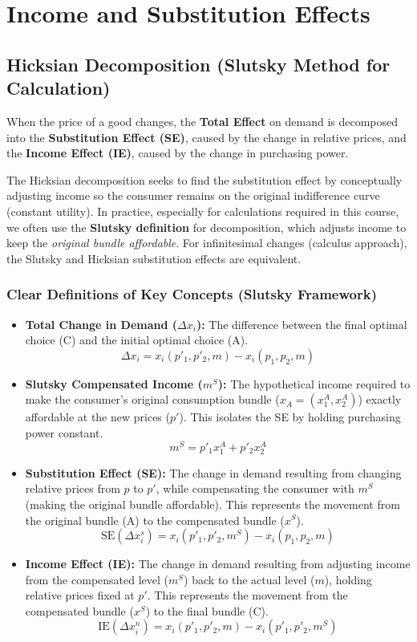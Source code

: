 \documentclass{article}
\begin{document}
\hrulefill

\section*{Income and Substitution Effects}
\subsection*{Hicksian Decomposition (Slutsky Method for Calculation)}

When the price of a good changes, the \textbf{Total Effect} on demand is decomposed into the \textbf{Substitution Effect (SE)}, caused by the change in relative prices, and the \textbf{Income Effect (IE)}, caused by the change in purchasing power.

The Hicksian decomposition seeks to find the substitution effect by conceptually adjusting income so the consumer remains on the original indifference curve (constant utility). In practice, especially for calculations required in this course, we often use the \textbf{Slutsky definition} for decomposition, which adjusts income to keep the \textit{original bundle affordable}. For infinitesimal changes (calculus approach), the Slutsky and Hicksian substitution effects are equivalent.

\subsubsection*{Clear Definitions of Key Concepts (Slutsky Framework)}
\begin{itemize}
	\item \textbf{Total Change in Demand ($\Delta x_i$):} The difference between the final optimal choice (C) and the initial optimal choice (A). \[\Delta x_i = x_i(p'_1, p'_2, m) - x_i(p_1, p_2, m)\]
	\item \textbf{Slutsky Compensated Income ($m^S$):} The hypothetical income required to make the consumer's original consumption bundle ($x_A = (x_1^A, x_2^A)$) exactly affordable at the new prices ($p'$). This isolates the SE by holding purchasing power constant. \[m^S = p'_1 x_1^A + p'_2 x_2^A\]
	\item \textbf{Substitution Effect (SE):} The change in demand resulting from changing relative prices from $p$ to $p'$, while compensating the consumer with $m^S$ (making the original bundle affordable). This represents the movement from the original bundle (A) to the compensated bundle ($x^S$). \[\text{SE} (\Delta x_i^s) = x_i(p'_1, p'_2, m^S) - x_i(p_1, p_2, m)\]
	\item \textbf{Income Effect (IE):} The change in demand resulting from adjusting income from the compensated level ($m^S$) back to the actual level ($m$), holding relative prices fixed at $p'$. This represents the movement from the compensated bundle ($x^S$) to the final bundle (C). \[\text{IE} (\Delta x_i^n) = x_i(p'_1, p'_2, m) - x_i(p'_1, p'_2, m^S)\]
\end{itemize}
\end{document}
